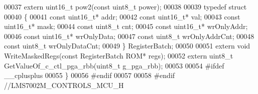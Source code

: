 \begin{DoxyCode}
00037 \textcolor{keyword}{extern} uint16\_t pow2(\textcolor{keyword}{const} uint8\_t power);
00038 
00039 \textcolor{keyword}{typedef} \textcolor{keyword}{struct}
00040 \{
00041     \textcolor{keyword}{const} uint16\_t* addr;
00042     \textcolor{keyword}{const} uint16\_t* val;
00043     \textcolor{keyword}{const} uint16\_t* mask;
00044     \textcolor{keyword}{const} uint8\_t cnt;
00045     \textcolor{keyword}{const} uint16\_t* wrOnlyAddr;
00046     \textcolor{keyword}{const} uint16\_t* wrOnlyData;
00047     \textcolor{keyword}{const} uint8\_t wrOnlyAddrCnt;
00048     \textcolor{keyword}{const} uint8\_t wrOnlyDataCnt;
00049 \} RegisterBatch;
00050 
00051 \textcolor{keyword}{extern} \textcolor{keywordtype}{void} WriteMaskedRegs(\textcolor{keyword}{const} RegisterBatch ROM* regs);
00052 \textcolor{keyword}{extern} uint8\_t GetValueOf_c_ctl_pga_rbb(uint8\_t g\_pga\_rbb);
00053 
00054 \textcolor{preprocessor}{#ifdef \_\_cplusplus}
00055 \}
00056 \textcolor{preprocessor}{#endif}
00057 
00058 \textcolor{preprocessor}{#endif //LMS7002M\_CONTROLS\_MCU\_H}
\end{DoxyCode}

